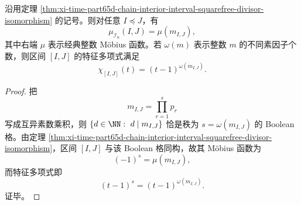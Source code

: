 \begin{corollary}\label{cor:xi-time-part65d-chain-interval-mobius-characteristic-arithmetic}
沿用定理 \ref{thm:xi-time-part65d-chain-interior-interval-squarefree-divisor-isomorphism} 的记号。则对任意 \(I\preceq J\)，有
\[
\mu_{\mathcal I_n}(I,J)=\mu(m_{I,J}),
\]
其中右端 \(\mu\) 表示经典整数 Möbius 函数。若 \(\omega(m)\) 表示整数 \(m\) 的不同素因子个数，则区间 \([I,J]\) 的特征多项式满足
\[
\chi_{[I,J]}(t)=(t-1)^{\omega(m_{I,J})}.
\]
\end{corollary}
\begin{proof}
把
\[
m_{I,J}=\prod_{r=1}^{s}p_r
\]
写成互异素数乘积，则 \(\{d\in\NN:\ d\mid m_{I,J}\}\) 恰是秩为 \(s=\omega(m_{I,J})\) 的 Boolean 格。由定理
\ref{thm:xi-time-part65d-chain-interior-interval-squarefree-divisor-isomorphism}，区间 \([I,J]\) 与该 Boolean 格同构，故其 Möbius 函数为
\[
(-1)^s=\mu(m_{I,J}),
\]
而特征多项式即
\[
(t-1)^s=(t-1)^{\omega(m_{I,J})}.
\]
证毕。
\end{proof}

